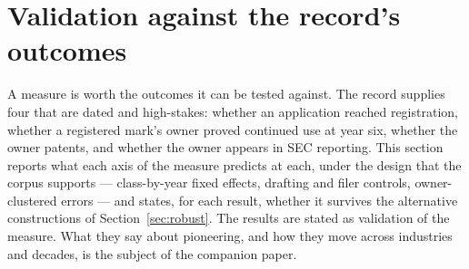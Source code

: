 \section{Validation against the record's outcomes}\label{sec:validation}

A measure is worth the outcomes it can be tested against. The record
supplies four that are dated and high-stakes: whether an application
reached registration, whether a registered mark's owner proved continued
use at year six, whether the owner patents, and whether the owner appears
in SEC reporting. This section reports what each axis of the measure
predicts at each, under the design that the corpus supports ---
class-by-year fixed effects, drafting and filer controls, owner-clustered
errors --- and states, for each result, whether it survives the
alternative constructions of Section~\ref{sec:robust}. The results are
stated as validation of the measure. What they say about pioneering, and
how they move across industries and decades, is the subject of the
companion paper.
